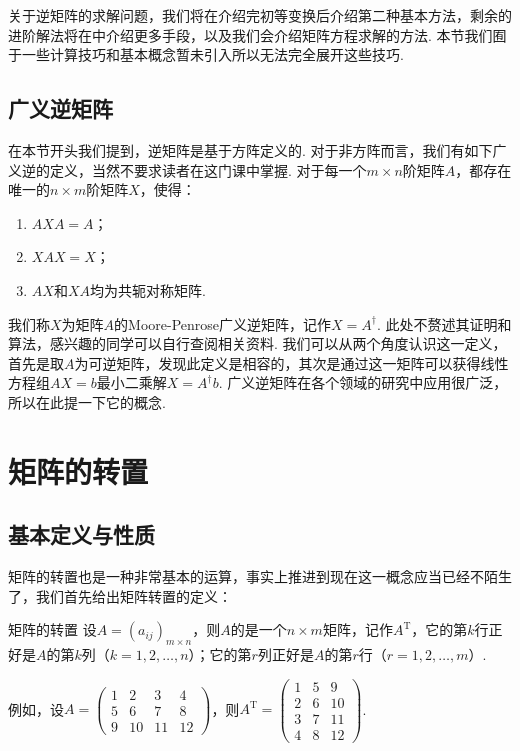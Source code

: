 关于逆矩阵的求解问题，我们将在介绍完初等变换后介绍第二种基本方法，剩余的进阶解法将在中介绍更多手段，以及我们会介绍矩阵方程求解的方法. 本节我们囿于一些计算技巧和基本概念暂未引入所以无法完全展开这些技巧.

\subsection{广义逆矩阵}

在本节开头我们提到，逆矩阵是基于方阵定义的. 对于非方阵而言，我们有如下广义逆的定义，当然不要求读者在这门课中掌握. 对于每一个$m \times n$阶矩阵$A$，都存在唯一的$n \times m$阶矩阵$X$，使得：
\begin{enumerate}
    \item $AXA=A$；

    \item $XAX=X$；

    \item $AX$和$XA$均为共轭对称矩阵.
\end{enumerate}
我们称$X$为矩阵$A$的Moore-Penrose广义逆矩阵，记作$X=A^\dagger$. 此处不赘述其证明和算法，感兴趣的同学可以自行查阅相关资料. 我们可以从两个角度认识这一定义，首先是取$A$为可逆矩阵，发现此定义是相容的，其次是通过这一矩阵可以获得线性方程组$AX=b$最小二乘解$X=A^\dagger b$. 广义逆矩阵在各个领域的研究中应用很广泛，所以在此提一下它的概念.

\section{矩阵的转置}
\subsection{基本定义与性质}

矩阵的转置也是一种非常基本的运算，事实上推进到现在这一概念应当已经不陌生了，我们首先给出矩阵转置的定义：

\begin{definition}{矩阵的转置}{}
    设$A=(a_{ij})_{m \times n}$，则$A$的是一个$n \times m$矩阵，记作$A^\mathrm{T}$，它的第$k$行正好是$A$的第$k$列（$k=1,2,\ldots,n$）；它的第$r$列正好是$A$的第$r$行（$r=1,2,\ldots,m$）.
\end{definition}

例如，设$A=\begin{pmatrix}1 & 2 & 3 & 4 \\ 5 & 6 & 7 & 8 \\ 9 & 10 & 11 & 12\end{pmatrix}$，则$A^\mathrm{T}=\begin{pmatrix}1 & 5 & 9 \\ 2 & 6 & 10 \\ 3 & 7 & 11 \\ 4 & 8 & 12\end{pmatrix}$.

